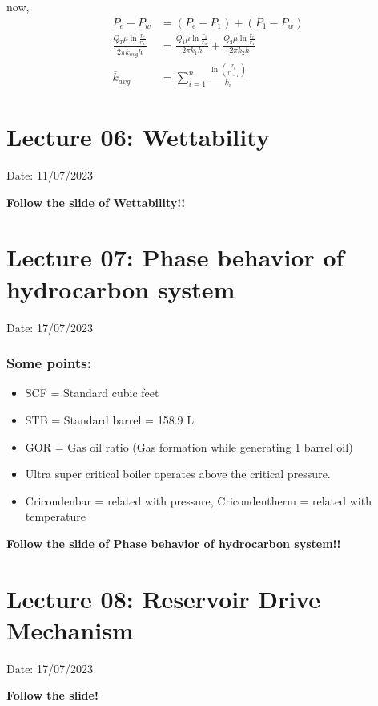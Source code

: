 \documentclass{article}
\begin{document}
now,
\begin{align*}
    P_e - P_w &= (P_e-P_1)+(P_1-P_w) \\ 
    \frac{Q_T \mu \ln \frac{r_e}{r_w}}{2\pi \overline{k}_{avg} h} &= \frac{Q_1 \mu \ln \frac{r_1}{r_w}}{2\pi k_1 h} + \frac{Q_2 \mu \ln \frac{r_e}{r_1}}{2\pi k_2 h} \\
    \overline{k}_{avg} &= \sum_{i=1}^{n} \frac{\ln \left(\frac{r_i}{r_{i-1}}\right)}{k_i}
\end{align*}

\section{Lecture 06: Wettability} 
\hfill Date: 11/07/2023

\textbf{Follow the slide of Wettability!!}
\vspace*{1cm}

\section{Lecture 07: Phase behavior of hydrocarbon system}  
\hfill Date: 17/07/2023

\subsubsection*{Some points:}
\begin{itemize}
    \item SCF = Standard cubic feet 
    \item STB = Standard barrel = 158.9 L 
    \item GOR = Gas oil ratio (Gas formation while generating 1 barrel oil)
    \item Ultra super critical boiler operates above the critical pressure. 
    \item Cricondenbar = related with pressure, Cricondentherm = related with temperature 
\end{itemize}
\textbf{Follow the slide of Phase behavior of hydrocarbon system!!} 
\vspace*{1cm}

\section{Lecture 08: Reservoir Drive Mechanism}  
\hfill Date: 17/07/2023

\textbf{Follow the slide!} 
\hrulefill
\end{document}
